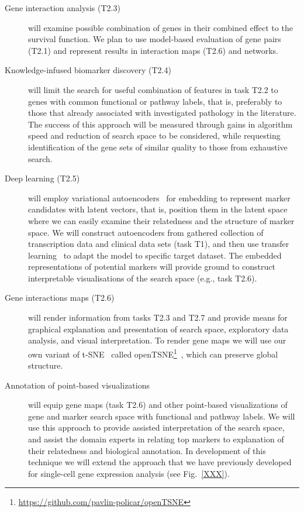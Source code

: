 \documentclass[11pt,a4paper]{article}
\newcommand{\myurl}[1]{\footnote{\url{#1}}}
\begin{document}
\begin{description}
\begin{description}
		\item[Gene interaction analysis (T2.3)] will examine possible combination of genes in their combined effect to the survival function. We plan to use model-based evaluation of gene pairs (T2.1) and represent results in interaction maps (T2.6) and networks.
		\item[Knowledge-infused biomarker discovery (T2.4)] will limit the search for useful combination of features in task T2.2 to genes with common functional or pathway labels, that is, preferably to those that already associated with investigated pathology in the literature. The success of this approach will be measured through gains in algorithm speed and reduction of search space to be considered, while requesting identification of the gene sets of similar quality to those from exhaustive search.
		\item[Deep learning (T2.5)] will employ variational autoencoders~\cite{} for embedding to represent marker candidates with latent vectors, that is, position them in the latent space where we can easily examine their relatedness and the structure of marker space. We will construct autoencoders from gathered collection of transcription data and clinical data sets (task T1), and then use transfer learning~\cite{} to adapt the model to specific target dataset. The embedded representations of potential markers will provide ground to construct interpretable visualisations of the search space (e.g., task T2.6).
		\item[Gene interactions maps (T2.6)] will render information from tasks T2.3 and T2.7 and provide means for graphical explanation and presentation of search space, exploratory data analysis, and visual interpretation. To render gene maps we will use our own variant of t-SNE~\cite{vanDerMaaten2008} called openTSNE\myurl{https://github.com/pavlin-policar/openTSNE}~\cite{policar2019}, which can preserve global structure.
		\item[Annotation of point-based visualizations] will equip gene maps (task T2.6) and other point-based visualizations of gene and marker search space with functional and pathway labels. We will use this approach to provide assisted interpretation of the search space, and assist the domain experts in relating top markers to explanation of their relatedness and biological annotation. In development of this technique we will extend the approach that we have previously developed for single-cell gene expression analysis (see Fig.~\ref{XXX}).
	\end{description}


\end{description}
\end{document}
